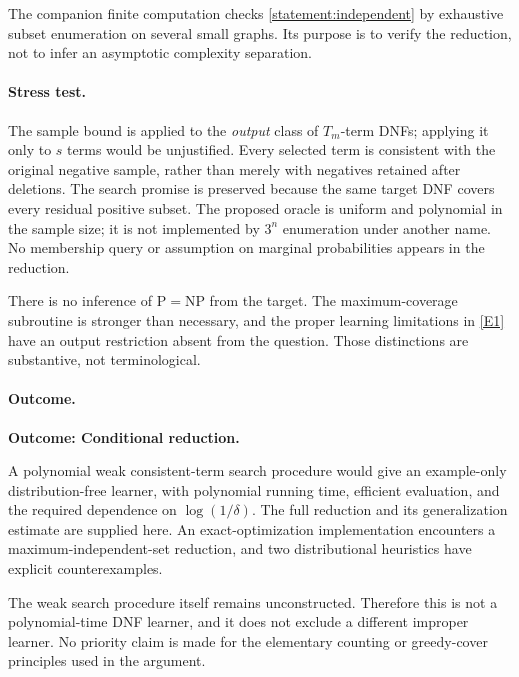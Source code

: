 \documentclass[11pt,a4paper]{article}
\newcommand{\eref}[2]{\hyperlink{extra:#1:#2}{[E#2]}}
\numberwithin{equation}{section}
\begin{document}
The companion finite computation checks \eqref{statement:independent} by
exhaustive subset enumeration on several small graphs. Its purpose is to
verify the reduction, not to infer an asymptotic complexity separation.

\paragraph{Stress test.}
The sample bound is applied to the \emph{output} class of $T_m$-term
DNFs; applying it only to $s$ terms would be unjustified. Every selected
term is consistent with the original negative sample, rather than merely
with negatives retained after deletions. The search promise is preserved
because the same target DNF covers every residual positive subset.
The proposed oracle is uniform and polynomial in the sample size; it is
not implemented by $3^n$ enumeration under another name. No membership
query or assumption on marginal probabilities appears in the reduction.

There is no inference of $\mathrm P=\mathrm{NP}$ from the target. The
maximum-coverage subroutine is stronger than necessary, and the proper
learning limitations in \eref{statement}{1} have an output restriction absent
from the question. Those distinctions are substantive, not terminological.

\paragraph{Outcome.}
\textbf{Outcome: Conditional reduction.}

A polynomial weak consistent-term search procedure would give an
example-only distribution-free learner, with polynomial running time,
efficient evaluation, and the required dependence on $\log(1/\delta)$.
The full reduction and its generalization estimate are supplied here.
An exact-optimization implementation encounters a maximum-independent-set
reduction, and two distributional heuristics have explicit counterexamples.

The weak search procedure itself remains unconstructed. Therefore this
is not a polynomial-time DNF learner, and it does not exclude a different
improper learner. No priority claim is made for the elementary counting
or greedy-cover principles used in the argument.
\end{document}
